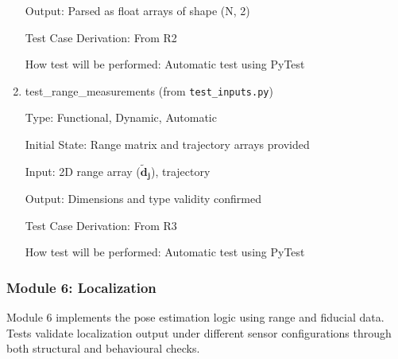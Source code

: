 \documentclass[12pt, titlepage]{article}
\begin{document}
\begin{enumerate}
Output: Parsed as float arrays of shape (N, 2)

Test Case Derivation: From R2

How test will be performed: Automatic test using PyTest

\item{test\_range\_measurements (from \texttt{test\_inputs.py})\\}

Type: Functional, Dynamic, Automatic
					
Initial State: Range matrix and trajectory arrays provided
					
Input: 2D range array ($\mathbf{\tilde{d}_j}$), trajectory
					
Output: Dimensions and type validity confirmed

Test Case Derivation: From R3

How test will be performed: Automatic test using PyTest
    
\end{enumerate}

\subsubsection{Module 6: Localization}

Module 6 implements the pose estimation logic using range and fiducial data. Tests validate localization output under different sensor configurations through both structural and behavioural checks.
\end{document}
